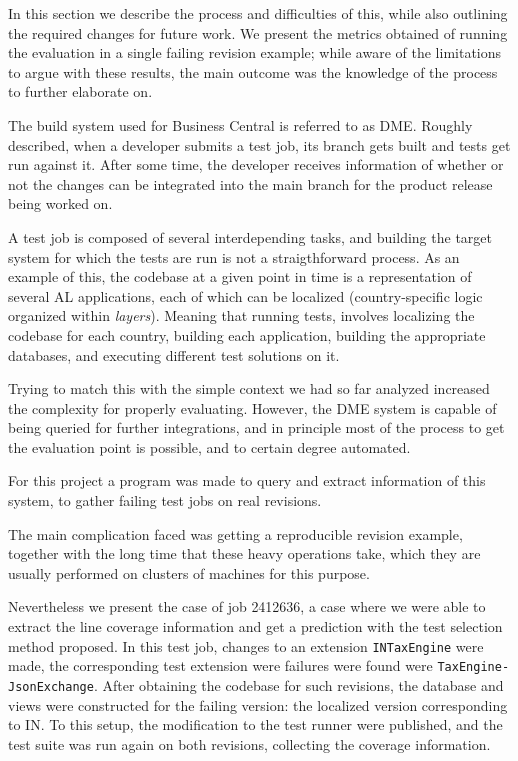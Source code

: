 \documentclass{article}
\begin{document}
In this section we describe the process and difficulties of this, while also outlining the required changes for future work. We present the metrics obtained of running the evaluation in a single failing revision example; while aware of the limitations to argue with these results, the main outcome was the knowledge of the process to further elaborate on.

The build system used for Business Central is referred to as DME. Roughly described, when a developer submits a test job, its branch gets built and tests get run against it. After some time, the developer receives information of whether or not the changes can be integrated into the main branch for the product release being worked on.

A test job is composed of several interdepending tasks, and building the target system for which the tests are run is not a straigthforward process. As an example of this, the codebase at a given point in time is a representation of several AL applications, each of which can be localized (country-specific logic organized within \emph{layers}). Meaning that running tests, involves localizing the codebase for each country, building each application, building the appropriate databases, and executing different test solutions on it.

Trying to match this with the simple context we had so far analyzed increased the complexity for properly evaluating. However, the DME system is capable of being queried for further integrations, and in principle most of the process to get the evaluation point is possible, and to certain degree automated.

For this project a program was made to query and extract information of this system, to gather failing test jobs on real revisions.

The main complication faced was getting a reproducible revision example, together with the long time that these heavy operations take, which they are usually performed on clusters of machines for this purpose.

Nevertheless we present the case of job 2412636, a case where we were able to extract the line coverage information and get a prediction with the test selection method proposed. In this test job, changes to an extension \texttt{INTaxEngine} were made, the corresponding test extension were failures were found were \texttt{TaxEngine-JsonExchange}. After obtaining the codebase for such revisions, the database and views were constructed for the failing version: the localized version corresponding to IN. To this setup, the modification to the test runner were published, and the test suite was run again on both revisions, collecting the coverage information.
\end{document}
